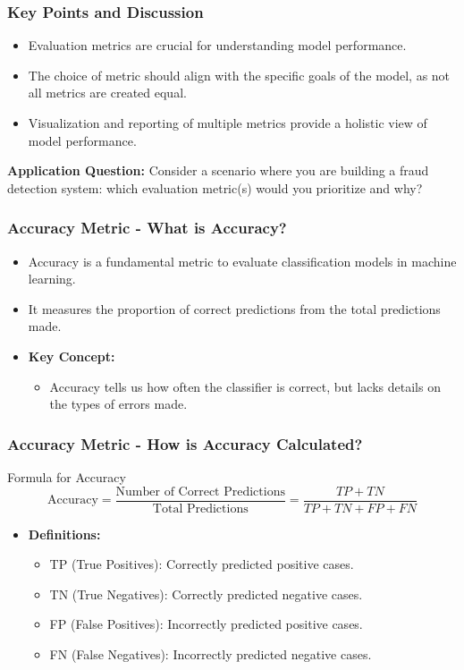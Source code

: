 \documentclass[aspectratio=169]{beamer}
\begin{document}
\begin{frame}[fragile]
    \frametitle{Key Points and Discussion}
    \begin{itemize}
        \item Evaluation metrics are crucial for understanding model performance.
        \item The choice of metric should align with the specific goals of the model, as not all metrics are created equal.
        \item Visualization and reporting of multiple metrics provide a holistic view of model performance.
    \end{itemize}
    
    \textbf{Application Question:} Consider a scenario where you are building a fraud detection system: which evaluation metric(s) would you prioritize and why?
\end{frame}

\begin{frame}[fragile]
    \frametitle{Accuracy Metric - What is Accuracy?}
    \begin{itemize}
        \item Accuracy is a fundamental metric to evaluate classification models in machine learning.
        \item It measures the proportion of correct predictions from the total predictions made.
        \item \textbf{Key Concept:} 
        \begin{itemize}
            \item Accuracy tells us how often the classifier is correct, but lacks details on the types of errors made.
        \end{itemize}
    \end{itemize}
\end{frame}

\begin{frame}[fragile]
    \frametitle{Accuracy Metric - How is Accuracy Calculated?}
    \begin{block}{Formula for Accuracy}
        \[
        \text{Accuracy} = \frac{\text{Number of Correct Predictions}}{\text{Total Predictions}} = \frac{TP + TN}{TP + TN + FP + FN}
        \]
    \end{block}
    \begin{itemize}
        \item \textbf{Definitions:} 
        \begin{itemize}
            \item TP (True Positives): Correctly predicted positive cases.
            \item TN (True Negatives): Correctly predicted negative cases.
            \item FP (False Positives): Incorrectly predicted positive cases.
            \item FN (False Negatives): Incorrectly predicted negative cases.
        \end{itemize}
    \end{itemize}
\end{frame}
\end{document}
